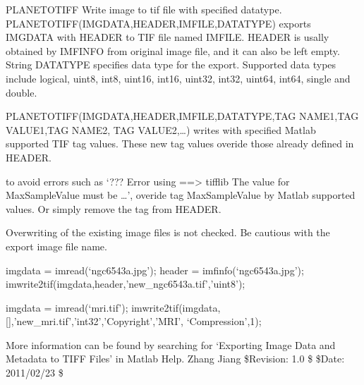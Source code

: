 \documentclass[letterpaper,10pt,english]{sphinxmanual}
\begin{document}
\begin{fulllineitems}
\label{\detokenize{api/utils:planeToTiff}}
\pysigstartsignatures
{}
\pysigstopsignatures
\sphinxAtStartPar
PLANETOTIFF Write image to tif file with specified datatype.
PLANETOTIFF(IMGDATA,HEADER,IMFILE,DATATYPE) exports IMGDATA with HEADER
to TIF file named IMFILE. HEADER is usally obtained by IMFINFO from
original image file, and it can also be left empty. String DATATYPE
specifies data type for the export. Supported data types include
logical, uint8, int8, uint16, int16, uint32, int32, uint64, int64,
single and double.

\sphinxAtStartPar
PLANETOTIFF(IMGDATA,HEADER,IMFILE,DATATYPE,TAG NAME1,TAG VALUE1,TAG NAME2,
TAG VALUE2,…) writes with specified Matlab supported TIF tag values.
These new tag values overide those already defined in HEADER.
\begin{description}
\sphinxAtStartPar
to avoid errors such as ‘??? Error using ==\textgreater{} tifflib The value for
MaxSampleValue must be …’, overide tag MaxSampleValue by Matlab
supported values. Or simply remove the tag from HEADER.

\sphinxAtStartPar
Overwriting of the existing image files is not checked. Be cautious
with the export image file name.

\sphinxAtStartPar
imgdata = imread(‘ngc6543a.jpg’);
header  = imfinfo(‘ngc6543a.jpg’);
imwrite2tif(imgdata,header,’new\_ngc6543a.tif’,’uint8’);

\sphinxAtStartPar
imgdata = imread(‘mri.tif’);
imwrite2tif(imgdata,{[}{]},’new\_mri.tif’,’int32’,’Copyright’,’MRI’,
‘Compression’,1);

\end{description}

\sphinxAtStartPar
More information can be found by searching for ‘Exporting Image Data
and Metadata to TIFF Files’ in Matlab Help.
Zhang Jiang
\$Revision: 1.0 \$  \$Date: 2011/02/23 \$

\end{fulllineitems}

\end{document}
